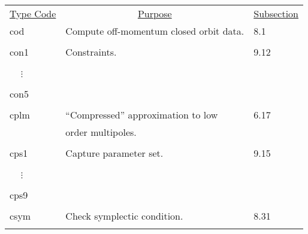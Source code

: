 \begin{center}
\newpage
\begin{tabular}{lll}
\multicolumn{1}{c}{\underline {Type Code}} &
\multicolumn{1}{c}{\underline{Purpose}}   &
\multicolumn{1}{c}{\underline{Subsection}} \\
\hspace{1.5em}cod   & Compute off-momentum closed orbit data.  & \hspace{2em}8.1\\
\vspace{-3mm}& &\\
\hspace{1.5em}con1   & Constraints.     & \hspace{2em}9.12\\
\vspace{-7mm}& &\\
\hspace{1.5em}\ \ \,$\vdots$ & &\\
\vspace{-7mm}& &\\
\hspace{1.5em}con5 & & \\
\vspace{-3mm}& &\\
\hspace{1.5em}cplm  &    ``Compressed'' approximation to low   &\hspace{2em}6.17\\
               &   order multipoles.                    &      \\
\vspace{-3mm}& &\\
\hspace{1.5em}cps1  &  Capture parameter set.        &          \hspace{2em}9.15\\
\vspace{-7mm}& &\\
\hspace{1.5em}\ \ \,$\vdots$ & &\\
\vspace{-7mm}& &\\
\hspace{1.5em}cps9 & & \\
\vspace{-3mm}& &\\
\hspace{1.5em}csym  &  Check symplectic condition.    &   \hspace{2em}8.31\\
\vspace{-3mm}& &\\

\end{tabular}
\end{center}

